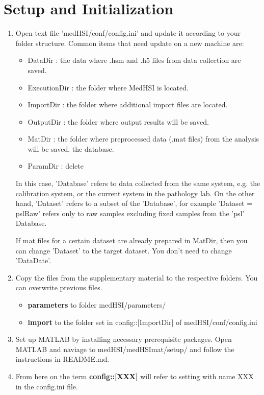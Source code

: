 \documentclass{foxelas_report}
\begin{document}
\section{Setup and Initialization} 
\begin{enumerate}

\item Open text file 'medHSI/conf/config.ini' and update it according to your folder structure. Common items that need update on a new machine are: 

\begin{itemize} 
\item DataDir : the data where .hsm and .h5 files from data collection are saved. 

\item ExecutionDir : the folder where MedHSI is located.

\item ImportDir : the folder where additional import files are located.

\item OutputDir : the folder where output results will be saved. 

\item MatDir : the folder where preprocessed data (.mat files) from the analysis will be saved, the database.

\item ParamDir : delete 

\end{itemize}

\par In this case, 'Database' refers to data collected from the same system, e.g. the calibration system, or the current system in the pathology lab. On the other hand, 'Dataset' refers to a subset of the 'Database', for example 'Dataset = pslRaw' refers only to raw samples excluding fixed samples from the 'psl' Database. 

\par If mat files for a certain dataset are already prepared in MatDir, then you can change 'Dataset' to the target dataset. You don't need to change 'DataDate'. 


\item Copy the files from the supplementary material to the respective folders. You can overwrite previous files. 

\begin{itemize}
\item \textbf{parameters} to folder medHSI/parameters/
\item \textbf{import} to the folder set in config::[ImportDir] of medHSI/conf/config.ini
\end{itemize}


\item Set up MATLAB by installing necessary prerequisite packages. Open MATLAB and naviage to  medHSI/medHSImat/setup/ and follow the instructions in README.md. 

\item From here on the term \textbf{config::[XXX]} will refer to setting with name XXX in the config.ini file. 
\end{enumerate}
\end{document}
